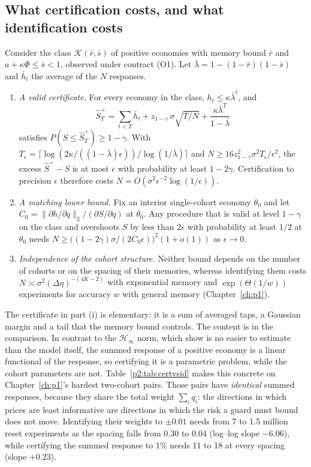 \subsection{What certification costs, and what identification costs}

\begin{theorem}\label{p2:thm:certcost}
Consider the class $\mathcal K(\bar r,\bar s)$ of positive economies with memory bound $\bar r$ and $a+\kappa\Phi\le\bar s<1$, observed under contract (O1). Let $\bar\lambda=1-(1-\bar r)(1-\bar s)$ and $\bar h_t$ the average of the $N$ responses.
\begin{enumerate}[label=(\roman*)]
\item \emph{A valid certificate.} For every economy in the class, $h_t\le\kappa\bar\lambda^t$, and
\[
\hat S^+_T=\sum_{t<T}\bar h_t+z_{1-\gamma}\,\sigma\sqrt{T/N}+\frac{\kappa\bar\lambda^T}{1-\bar\lambda}
\]
satisfies $P(S\le\hat S^+_T)\ge1-\gamma$. With $T_\epsilon=\lceil\log(2\kappa/((1-\bar\lambda)\epsilon))/\log(1/\bar\lambda)\rceil$ and $N\ge16z_{1-\gamma}^2\sigma^2T_\epsilon/\epsilon^2$, the excess $\hat S^+-S$ is at most $\epsilon$ with probability at least $1-2\gamma$. Certification to precision $\epsilon$ therefore costs $N=O(\sigma^2\epsilon^{-2}\log(1/\epsilon))$.
\item \emph{A matching lower bound.} Fix an interior single-cohort economy $\theta_0$ and let $C_0=\|\partial h/\partial q\|_2/(\partial S/\partial q)$ at $\theta_0$. Any procedure that is valid at level $1-\gamma$ on the class and overshoots $S$ by less than $2\epsilon$ with probability at least $1/2$ at $\theta_0$ needs $N\ge\bigl((1-2\gamma)\sigma/(2C_0\epsilon)\bigr)^2(1+o(1))$ as $\epsilon\to0$.
\item \emph{Independence of the cohort structure.} Neither bound depends on the number of cohorts or on the spacing of their memories, whereas identifying them costs $N\asymp\sigma^2(\Delta\eta)^{-(4K-2)}$ with exponential memory and $\exp(\Theta(1/w))$ experiments for accuracy $w$ with general memory (Chapter~\ref{ch:p1}).
\end{enumerate}
\end{theorem}

The certificate in part (i) is elementary: it is a sum of averaged taps, a Gaussian margin and a tail that the memory bound controls. The content is in the comparison. In contrast to the $\mathcal H_\infty$ norm, which \citet{p2:tu2018} show is no easier to estimate than the model itself, the summed response of a positive economy is a linear functional of the response, so certifying it is a parametric problem, while the cohort parameters are not. Table~\ref{p2:tab:certvsid} makes this concrete on Chapter~\ref{ch:p1}'s hardest two-cohort pairs. Those pairs have \emph{identical} summed responses, because they share the total weight $\sum_iq_i$: the directions in which prices are least informative are directions in which the risk a guard must bound does not move. Identifying their weights to $\pm0.01$ needs from 7 to 1.5 million reset experiments as the spacing falls from $0.30$ to $0.04$ (log--log slope $-6.06$), while certifying the summed response to 1\% needs 11 to 18 at every spacing (slope $+0.23$).

